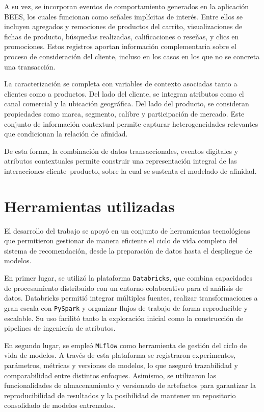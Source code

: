 A su vez, se incorporan eventos de comportamiento generados en la aplicación BEES, los cuales funcionan como señales implícitas de interés. Entre ellos se incluyen agregados y remociones de productos del carrito, visualizaciones de fichas de producto, búsquedas realizadas, calificaciones o reseñas, y clics en promociones. Estos registros aportan información complementaria sobre el proceso de consideración del cliente, incluso en los casos en los que no se concreta una transacción.

La caracterización se completa con variables de contexto asociadas tanto a clientes como a productos. Del lado del cliente, se integran atributos como el canal comercial y la ubicación geográfica. Del lado del producto, se consideran propiedades como marca, segmento, calibre y participación de mercado. Este conjunto de información contextual permite capturar heterogeneidades relevantes que condicionan la relación de afinidad.

De esta forma, la combinación de datos transaccionales, eventos digitales y atributos contextuales permite construir una representación integral de las interacciones cliente–producto, sobre la cual se sustenta el modelado de afinidad.





\section{Herramientas utilizadas}

El desarrollo del trabajo se apoyó en un conjunto de herramientas tecnológicas que permitieron gestionar de manera eficiente el ciclo de vida completo del sistema de recomendación, desde la preparación de datos hasta el despliegue de modelos.

En primer lugar, se utilizó la plataforma \texttt{Databricks}, que combina capacidades de procesamiento distribuido con un entorno colaborativo para el análisis de datos. Databricks permitió integrar múltiples fuentes, realizar transformaciones a gran escala con \texttt{PySpark} y organizar flujos de trabajo de forma reproducible y escalable. Su uso facilitó tanto la exploración inicial como la construcción de pipelines de ingeniería de atributos.

En segundo lugar, se empleó \texttt{MLflow} como herramienta de gestión del ciclo de vida de modelos. A través de esta plataforma se registraron experimentos, parámetros, métricas y versiones de modelos, lo que aseguró trazabilidad y comparabilidad entre distintos enfoques. Asimismo, se utilizaron las funcionalidades de almacenamiento y versionado de artefactos para garantizar la reproducibilidad de resultados y la posibilidad de mantener un repositorio consolidado de modelos entrenados.

